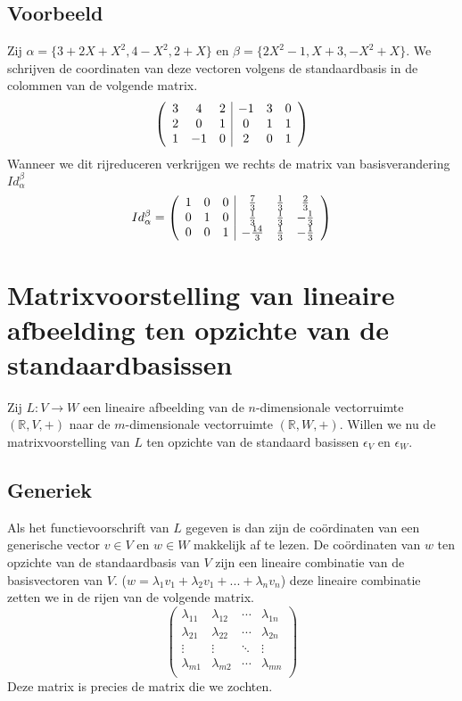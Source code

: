 \documentclass[lineaire_algebra_oplossingen.tex]{subfiles}
\begin{document}
\subsection*{Voorbeeld}
Zij $\alpha = \{3+2X+X^2,4-X^2,2+X\}$ en $\beta = \{2X^2-1,X+3,-X^2+X\}$.
We schrijven de coordinaten van deze vectoren volgens de standaardbasis in de colommen van de volgende matrix.
\[
\left(
\begin{array}{c c c | c c c}
3 & 4 & 2 & -1 & 3 & 0\\
2 & 0 & 1 & 0 & 1 & 1\\
1 & -1 & 0 & 2 & 0 & 1\\
\end{array}
\right)
\]
Wanneer we dit rijreduceren verkrijgen we rechts de matrix van basisverandering $Id_\alpha^\beta$
\[
Id_\alpha^\beta =
\left(
\begin{array}{c c c | c c c}
1 & 0 & 0 & \frac{7}{3} & \frac{1}{3} & \frac{2}{3}\\
0 & 1 & 0 & \frac{1}{3} & \frac{1}{3} & -\frac{1}{3}\\
0 & 0 & 1 & -\frac{14}{3} & \frac{1}{3} & -\frac{1}{3}\\
\end{array}
\right)
\]

\section{Matrixvoorstelling van lineaire afbeelding ten opzichte van de standaardbasissen}
Zij $L:V\rightarrow W$ een lineaire afbeelding van de $n$-dimensionale vectorruimte $(\mathbb{R},V,+)$ naar de $m$-dimensionale vectorruimte $(\mathbb{R},W,+)$. Willen we nu de matrixvoorstelling van $L$ ten opzichte van de standaard basissen $\epsilon_V$ en $\epsilon_W$.

\subsection*{Generiek}
Als het functievoorschrift van $L$ gegeven is dan zijn de co\"ordinaten van een generische vector $v\in V$ en $w\in W$ makkelijk af te lezen.
De co\"ordinaten van $w$ ten opzichte van de standaardbasis van $V$ zijn een lineaire combinatie van de basisvectoren van $V$. ($w = \lambda_1v_1+\lambda_2v_1+...+\lambda_nv_n$) deze lineaire combinatie zetten we in de rijen van de volgende matrix.
\[
\begin{pmatrix}
\lambda_{11} & \lambda_{12} & \cdots & \lambda_{1n} \\
\lambda_{21} & \lambda_{22} & \cdots & \lambda_{2n} \\
\vdots & \vdots & \ddots & \vdots\\
\lambda_{m1} & \lambda_{m2} & \cdots & \lambda_{mn} \\
\end{pmatrix}
\]
Deze matrix is precies de matrix die we zochten.
\end{document}
